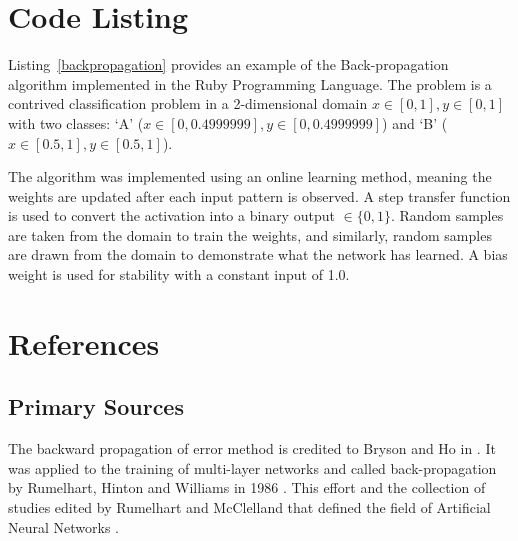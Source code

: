 \documentclass[a4paper, 11pt]{article}
\begin{document}
\section{Code Listing}
\label{sec:code}
Listing~\ref{backpropagation} provides an example of the Back-propagation algorithm implemented in the Ruby Programming Language. 
The problem is a contrived classification problem in a 2-dimensional domain $x\in[0,1], y\in[0,1]$ with two classes: `A' ($x\in[0,0.4999999], y\in[0,0.4999999]$) and `B' ($x\in[0.5,1], y\in[0.5,1]$).

The algorithm was implemented using an online learning method, meaning the weights are updated after each input pattern is observed. A step transfer function is used to convert the activation into a binary output $\in\{0,1\}$. Random samples are taken from the domain to train the weights, and similarly, random samples are drawn from the domain to demonstrate what the network has learned. A bias weight is used for stability with a constant input of 1.0.




\section{References}
\label{sec:references}

% 
% 
\subsection{Primary Sources}
The backward propagation of error method is credited to Bryson and Ho in \cite{Bryson1969}. It was applied to the training of multi-layer networks and called back-propagation by Rumelhart, Hinton and Williams in 1986 \cite{Rumelhart1986b, Rumelhart1986c}. 
This effort and the collection of studies edited by Rumelhart and McClelland that defined the field of Artificial Neural Networks \cite{Rumelhart1986, Rumelhart1986a}.
\end{document}
